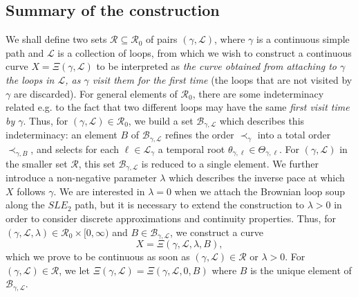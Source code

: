 \documentclass[11pt]{article}
\def\Conf{{\mathscr{R}}}
\def\Att{{\Xi}}
\begin{document}
 \subsection{Summary of the construction}

We shall define two sets $\Conf\subseteq \Conf_0$ of pairs $(\gamma,\mathcal{L})$, where $\gamma$ is a continuous simple path and $\mathcal{L}$ is a collection of loops, from which we wish to construct a continuous curve $X=\Att(\gamma,\mathcal{L})$ to be interpreted as {\it the curve obtained from attaching to $\gamma$ the loops in $\mathcal{L}$, as $\gamma$ visit them for the first time} (the loops that are not visited by $\gamma$ are discarded). For general elements of $\Conf_0$, there are some indeterminacy related e.g. to the fact that two different loops may have the same {\it first visit time by $\gamma$}.
Thus, for $(\gamma,\mathcal{L})\in \Conf_0$, we build a set $\mathcal{B}_{\gamma,\mathcal{L}}$ which describes this indeterminacy: an element $B$ of  $\mathcal{B}_{\gamma,\mathcal{L}}$ refines the order $\prec_\gamma$ into a total order $\prec_{\gamma,B}$, and selects for each $\ell\in \mathcal{L}_\gamma$ a temporal root $\theta_{\gamma,\ell}\in\Theta_{\gamma,\ell}$.
For $(\gamma,\mathcal{L})$ in the smaller set $\Conf$, this set $\mathcal{B}_{\gamma,\mathcal{L}}$  is reduced to a single element.
We further introduce a non-negative parameter $\lambda$ which describes the inverse pace at which $X$ follows $\gamma$. We are interested in $\lambda=0$ when we attach the Brownian loop soup along the $SLE_2$ path, but it is necessary to extend the construction to $\lambda>0$ in order to consider discrete approximations and continuity properties.
Thus, for $(\gamma,\mathcal{L},\lambda)\in \Conf_0\times[0,\infty)$  and $B\in \mathcal{B}_{\gamma,\mathcal{L}}$, we construct a curve
\[ X=\Att(\gamma,\mathcal{L},\lambda,B),\]
which we prove to be continuous as soon as $(\gamma,\mathcal{L})\in \Conf$ or $\lambda>0$. For $(\gamma,\mathcal{L})\in \Conf$, we let $\Att(\gamma,\mathcal{L})=\Att(\gamma, \mathcal{L},0,B)$ where $B$ is the unique element of $\mathcal{B}_{\gamma,\mathcal{L}}$.
\end{document}
